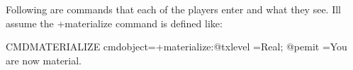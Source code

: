 \documentclass[letterpaper,10pt,english]{sphinxmanual}
\begin{document}
\sphinxAtStartPar
Following are commands that each of the players enter and what they see.  I\textquotesingle{}ll assume the +materialize command is defined like:

\begin{sphinxVerbatim}[commandchars=\\\{\}]
\PYGZam{}CMD\PYGZus{}MATERIALIZE \PYGZlt{}cmdobject\PYGZgt{}=\PYGZdl{}+materialize:@txlevel \PYGZpc{}\PYGZsh{}=Real; @pemit \PYGZpc{}\PYGZsh{}=You are now material.
\end{sphinxVerbatim}

\begin{sphinxVerbatim}[commandchars=\\\{\}]
                                                
                                                
                                              
                                           
                                
                                       
                                            
                                   
                                          
                                              
                                           
                                
                                       
                                       
                                   
                                          
                                                 
                                                 
                                                    

\end{sphinxVerbatim}
\end{document}
